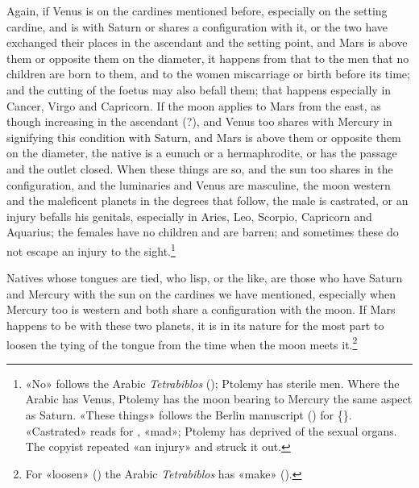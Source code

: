 \documentclass[11pt]{article}
\newcommand{\Fol}[1]{\marginpar{\footnotesize\color{gray}f.\,#1}}
\begin{document}
\par \Fol{53v}Again, if Venus is on the cardines mentioned before, especially on the setting cardine, and is with Saturn or shares a configuration with it, or the two have exchanged their places in the ascendant and the setting point, and Mars is above them or opposite them on the diameter, it happens from that to the men that no children are born to them, and to the women miscarriage or birth before its time; and the cutting of the foetus may also befall them; that happens especially in Cancer, Virgo and Capricorn. If the moon applies to Mars from the east, as though increasing in the ascendant (?), and Venus too shares with Mercury in signifying this condition with Saturn, and Mars is above them or opposite them on the diameter, the native is a eunuch or a hermaphrodite, or has the passage and the outlet closed. When these things are so, and the sun too shares in the configuration, and the luminaries and Venus are masculine, the moon western and the maleficent planets in the degrees that follow, the male is castrated, or an injury befalls his genitals, especially in Aries, Leo, Scorpio, Capricorn and Aquarius; the females have no children and are barren; and sometimes these do not escape an injury to the sight.\footnote{«No» follows the Arabic \emph{Tetrabiblos} (); Ptolemy has sterile men. Where the Arabic has Venus, Ptolemy has the moon bearing to Mercury the same aspect as Saturn. «These things» follows the Berlin manuscript () for \{\}. «Castrated» reads  for , «mad»; Ptolemy has deprived of the sexual organs. The copyist repeated «an injury» and struck it out.}\par
\par Natives whose tongues are tied, who lisp, or the like, are those who have Saturn and Mercury with the sun on the cardines we have mentioned, especially when Mercury too is western and both share a configuration with the moon. If Mars happens to be with these two planets, it is in its nature for the most part to loosen the tying of the tongue from the time when the moon meets it.\footnote{For «loosen» () the Arabic \emph{Tetrabiblos} has «make» ().}\par
\end{document}
